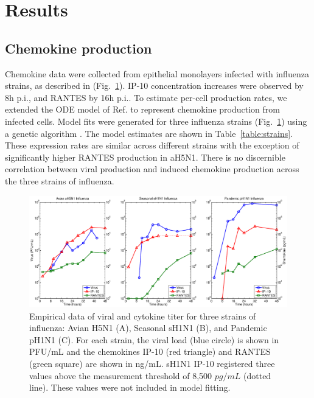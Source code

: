 \documentclass[10pt]{article}
\begin{document}
\section*{Results}

\subsection*{Chemokine production}

Chemokine data were collected from epithelial monolayers infected with influenza strains, as described in \cite{Mitchell2011} (Fig.~\ref{fig:data}).  IP-10 concentration increases were observed by 8h p.i., and RANTES by 16h p.i..  To estimate per-cell production rates, we extended the ODE model of Ref. \cite{Mitchell2011} to represent chemokine production from infected cells.  Model fits were generated for three influenza strains (Fig.~\ref{fig:data}) using a genetic algorithm \cite{Mitchell2011}.  The model estimates are shown in Table~\ref{table:strains}.  These expression rates are similar across different strains with the exception of significantly higher RANTES production in aH5N1.  There is no discernible correlation between viral production and induced chemokine production across the three strains of influenza.

\begin{figure}[ht!]
\begin{center}
 \includegraphics[width=\textwidth]{data}
 \end{center}
\caption{Empirical data of viral and cytokine titer for three strains of influenza: Avian H5N1 (A), Seasonal sH1N1 (B), and Pandemic pH1N1 (C).  For each strain, the viral load (blue circle) is shown in PFU/mL and the chemokines IP-10 (red triangle) and RANTES (green square) are shown in ng/mL.  sH1N1 IP-10 registered three values above the measurement threshold of 8,500 $pg/mL$ (dotted line).  These values were not included in model fitting.} 
 \label{fig:data}
\end{figure}
\end{document}
